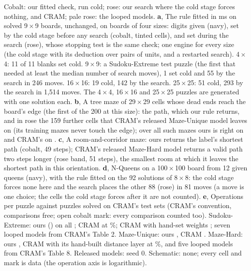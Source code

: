  Cobalt: our fitted check, run cold; rose: our search where the
cold stage forces nothing, and CRAM; pale rose: the looped models. \textbf{a}, The rule fitted in  ms on
 solved 9\,$\times$\,9 boards, unchanged, on boards of four sizes: digits given (navy), set by
the cold stage before any search (cobalt, tinted cells), and set during the search (rose), whose stopping test is the
same check; one engine for every size (the cold stage with its deduction over pairs of units, and a restarted search). 4\,$\times$\,4: 11 of 11 blanks set cold. 9\,$\times$\,9: a Sudoku-Extreme test puzzle (the first that
needed at least the median number of search moves), 1 set cold and 55 by the search in 246 moves. 16\,$\times$\,16: 19
cold, 142 by the search. 25\,$\times$\,25: 51 cold, 293 by the search in 1,514 moves. The 4\,$\times$\,4,
16\,$\times$\,16 and 25\,$\times$\,25 puzzles are generated with one solution each. \textbf{b}, A tree maze of
29\,$\times$\,29 cells whose dead ends reach the board's edge (the first of the 200 at this size): the path, which our
rule returns, and in rose the 159 further cells that CRAM's released Maze-Unique model leaves on (its training mazes never
touch the edge); over all  such mazes ours is right on  and CRAM's on .
\textbf{c}, A room-and-corridor maze: ours returns the label's shortest path (cobalt, 49 steps); CRAM's released
Maze-Hard model returns a valid path two steps longer (rose band, 51 steps), the smallest room at which it leaves the
shortest path in this orientation. \textbf{d}, N-Queens on a 100\,$\times$\,100 board from 12 given queens (navy), with
the rule fitted on the 92 solutions of 8\,$\times$\,8: the cold stage forces none here and the search places the other
88 (rose) in 81 moves (a move is one choice; the cells the cold stage forces after it are not counted). \textbf{e}, Operations per puzzle against puzzles solved on CRAM's test sets (CRAM's convention,
comparisons free; open cobalt mark: every comparison counted too). Sudoku-Extreme: ours 
() on all ; CRAM  at \%; CRAM with hand-set
weights ; seven looped models from CRAM's Table 2. Maze-Unique: ours , CRAM
. Maze-Hard: ours , CRAM with its hand-built distance layer  at
\%, and five looped models from CRAM's Table 8. Released models: seed 0. Schematic: none; every cell and
mark is data (the operation axis is logarithmic).
